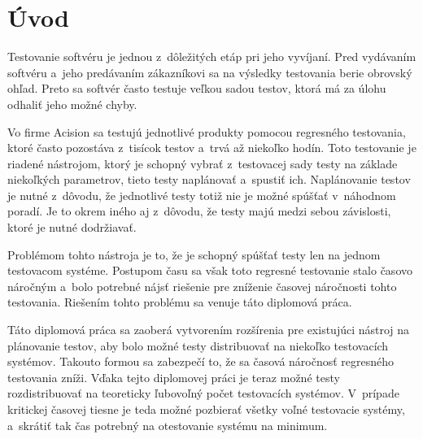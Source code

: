 


%
%
\chapter{Úvod}
\label{kapitola:uvod}
Testovanie softvéru je jednou z~dôležitých etáp pri jeho vyvíjaní.
Pred vydávaním softvéru a~jeho predávaním zákazníkovi sa na výsledky
testovania berie obrovský ohľad. Preto sa softvér často testuje veľkou
sadou testov, ktorá má za úlohu odhaliť jeho možné chyby.

Vo firme Acision sa testujú jednotlivé produkty pomocou regresného 
testovania, ktoré často pozostáva z~tisícok testov a~trvá až niekoľko hodín.
Toto testovanie je riadené nástrojom, ktorý je schopný vybrať 
z~testovacej sady testy na základe niekoľkých parametrov, tieto testy 
naplánovať a~spustiť ich. 
Naplánovanie testov je nutné z~dôvodu, že jednotlivé testy totiž nie je 
možné spúšťať v~náhodnom poradí. Je to okrem iného aj z~dôvodu, 
že testy majú medzi sebou závislosti, ktoré je nutné dodržiavať. 

Problémom tohto nástroja je to, že je schopný spúšťať testy len na
jednom testovacom systéme. Postupom času sa však toto regresné testovanie
stalo časovo náročným a~bolo potrebné nájsť riešenie pre zníženie časovej
náročnosti tohto testovania. 
Riešením tohto problému sa venuje táto diplomová práca.

Táto diplomová práca sa zaoberá vytvorením rozšírenia pre existujúci
nástroj na plánovanie testov, aby bolo možné testy distribuovať na 
niekoľko testovacích systémov. Takouto formou sa zabezpečí to, že 
sa časová náročnosť regresného testovania zníži. 
Vďaka tejto diplomovej práci je teraz možné testy rozdistribuovať na 
teoreticky ľubovoľný počet testovacích systémov.
V~prípade kritickej časovej tiesne je teda možné pozbierať všetky voľné
testovacie systémy, a~skrátiť tak čas potrebný na otestovanie systému
na minimum.

